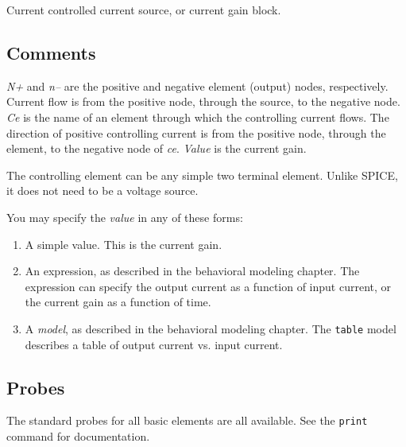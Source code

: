 Current controlled current source, or current gain block.
\subsection{Comments}

{\it N+} and {\it n--} are the positive and negative element (output)
nodes, respectively.  Current flow is from the positive node,
through the source, to the negative node.  {\it Ce} is the name of
an element through which the controlling current flows.  The
direction of positive controlling current is from the positive
node, through the element, to the negative node of {\it ce}.  {\it
Value} is the current gain.

The controlling element can be any simple two terminal element.
Unlike SPICE, it does not need to be a voltage source.

You may specify the {\it value} in any of these forms:

\begin{enumerate}
  
\item
A simple value.  This is the current gain.
  
\item
An expression, as described in the behavioral modeling chapter.  The
expression can specify the output current as a function of input
current, or the current gain as a function of time.

\item
A {\it model}, as described in the behavioral modeling chapter.  The
{\tt table} model describes a table of output current vs. input
current.

\end{enumerate}
\subsection{Probes}

The standard probes for all basic elements are all available.  See the
{\tt print} command for documentation.

